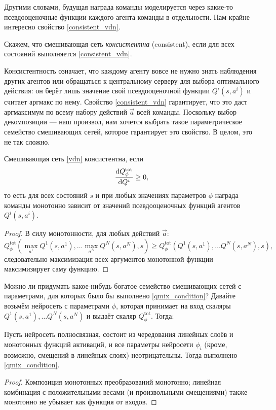 Другими словами, будущая награда команды моделируется через какие-то псевдооценочные функции каждого агента команды в отдельности. Нам крайне интересно свойство \eqref{consistent_vdn}.

\begin{definition}
Скажем, что смешивающая сеть \emph{консистентна} (consistent), если для всех состояний выполняется \eqref{consistent_vdn}.
\end{definition}

Консистентность означает, что каждому агенту вовсе не нужно знать наблюдения других агентов или обращаться к центральному серверу для выбора оптимального действия: он берёт лишь значение свой псевдооценочной функции $Q^i(s, a^i)$ и считает аргмакс по нему. Свойство \eqref{consistent_vdn} гарантирует, что это даст аргмаксимум по всему набору действий $\vec{a}$ всей команды. Поскольку выбор декомпозиции --- наш произвол, нам хочется выбрать такое параметрическое семейство смешивающих сетей, которое гарантирует это свойство. В целом, это не так сложно.

\begin{theorem}
Смешивающая сеть \eqref{vdn} консистентна, если
\begin{equation}\label{qmix_condition}
\frac{\mathop{}\!\mathrm{d} Q^{\mathrm{tot}}_{\phi}}{\mathop{}\!\mathrm{d} Q^i} \ge 0,
\end{equation}
то есть для всех состояний $s$ и при любых значениях параметров $\phi$ награда команды монотонно зависит от значений псевдооценочных функций агентов $Q^i(s, a^i)$.
\begin{proof}
В силу монотонности, для любых действий $\vec{a}$:
$$Q^{\mathrm{tot}}_{\phi}( \max_{a^1} Q^1(s, a^1), \dots \max_{a^N} Q^N(s, a^N), s) \ge Q^{\mathrm{tot}}_{\phi}( Q^1(s, a^1), \dots Q^N(s, a^N), s),$$
следовательно максимизация всех аргументов монотонной функции максимизирует саму функцию.
\end{proof}
\end{theorem}

Можно ли придумать какое-нибудь богатое семейство смешивающих сетей с параметрами, для которых было бы выполнено \eqref{qmix_condition}? Давайте возьмём нейросеть с параметрами $\phi$, которая принимает на вход скаляры $Q^1(s, a^1), \dots Q^N(s, a^N)$ и выдаёт скаляр $Q^{\mathrm{tot}}_{\phi}$. Тогда:
\begin{proposition}
Пусть нейросеть полносвязная, состоит из чередования линейных слоёв и монотонных функций активаций, и все параметры нейросети $\phi_i$ (кроме, возможно, смещений в линейных слоях) неотрицательны. Тогда выполнено \eqref{qmix_condition}.
\begin{proof}
Композиция монотонных преобразований монотонно; линейная комбинация с положительными весами (и произвольными смещениями) также монотонно не убывает как функция от входов.
\end{proof}
\end{proposition}

